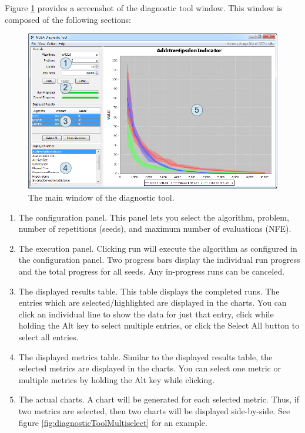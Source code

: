 Figure \ref{fig:diagnosticToolAnnotated} provides a screenshot of the diagnostic tool window.  This window is composed of the following sections:

\begin{figure}
  \includegraphics[width=\linewidth]{diagnosticToolAnnotated.png}
  \caption{The main window of the diagnostic tool.}
  \label{fig:diagnosticToolAnnotated}
\end{figure}

\begin{enumerate}
  \item The configuration panel.  This panel lets you select the algorithm, problem, number of repetitions (seeds), and maximum number of evaluations (NFE).
  \item The execution panel.  Clicking run will execute the algorithm as configured in the configuration panel.  Two progress bars display the individual run progress and the total progress for all seeds.  Any in-progress runs can be canceled.
  \item The displayed results table.  This table displays the completed runs.  The entries which are selected/highlighted are displayed in the charts.  You can click an individual line to show the data for just that entry, click while holding the Alt key to select multiple entries, or click the Select All button to select all entries.
  \item The displayed metrics table.  Similar to the displayed results table, the selected metrics are displayed in the charts.  You can select one metric or multiple metrics by holding the Alt key while clicking.
  \item The actual charts.  A chart will be generated for each selected metric.  Thus, if two metrics are selected, then two charts will be displayed side-by-side.  See figure \ref{fig:diagnosticToolMultiselect} for an example.
\end{enumerate}

